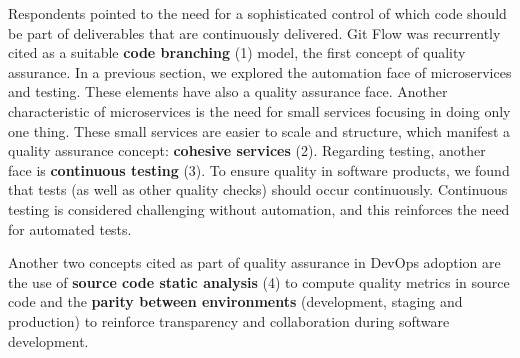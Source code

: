 Respondents pointed to the need for a sophisticated control of which code should
be part of deliverables that are continuously delivered. Git Flow was
recurrently cited as a suitable \textbf{code branching} (1) model, the first
concept of quality assurance.
In a previous section, we explored the automation face of
microservices and testing. These elements have also a quality assurance face.
Another characteristic of microservices is the need for small services focusing
in doing only one thing. These small services are easier to scale and
structure, which manifest a quality assurance concept: \textbf{cohesive
services} (2). Regarding testing, another face is \textbf{continuous
testing} (3). To ensure quality in software products, we found that
tests (as well as other quality checks) should occur continuously. Continuous testing
is considered challenging without automation, and this reinforces the need for automated
tests.

Another two concepts cited as part of quality assurance in DevOps adoption are
the use of \textbf{source code static analysis} (4) to compute quality metrics in
source code and the \textbf{parity between environments} (development, staging
and production) to reinforce transparency and collaboration during software
development.
